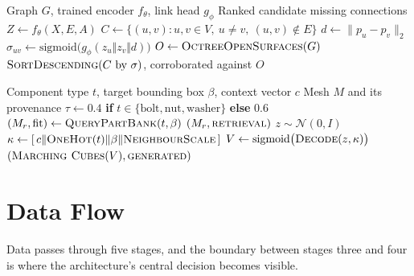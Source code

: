 \documentclass[12pt,oneside,a4paper]{report}
\begin{document}
\begin{algorithm}[h]
\caption{Missing-component detection at inference}
\label{alg:detect}
\begin{algorithmic}[1]
\Require Graph $G$, trained encoder $f_\theta$, link head $g_\phi$
\Ensure Ranked candidate missing connections
\State $Z \gets f_\theta(X, E, A)$ 
\State $C \gets \{(u,v) : u,v \in V,\ u \neq v,\ (u,v) \notin E\}$
  \State $d \gets \lVert p_u - p_v \rVert_2$ 
  \State $\sigma_{uv} \gets \mathrm{sigmoid}\big(g_\phi(z_u \Vert z_v \Vert d)\big)$
\EndFor
\State $O \gets \textsc{OctreeOpenSurfaces}(G)$ 
\State \Return $\textsc{SortDescending}(C \text{ by } \sigma)$, corroborated against $O$
\end{algorithmic}
\end{algorithm}

\begin{algorithm}[h]
\caption{Hybrid shape generation}
\label{alg:shapegen}
\begin{algorithmic}[1]
\Require Component type $t$, target bounding box $\beta$, context vector $c$
\Ensure Mesh $M$ and its provenance
\State $\tau \gets 0.4$ \textbf{if} $t \in \{\text{bolt},\text{nut},\text{washer}\}$ \textbf{else} $0.6$
\State $(M_r, \mathrm{fit}) \gets \textsc{QueryPartBank}(t, \beta)$
  \State \Return $(M_r, \textsc{retrieval})$ 
\EndIf
\State $z \sim \mathcal{N}(0, I)$
\State $\kappa \gets [\,c \Vert \textsc{OneHot}(t) \Vert \beta \Vert \textsc{NeighbourScale}\,]$ 
\State $V \gets \mathrm{sigmoid}\big(\textsc{Decode}(z, \kappa)\big)$ 
\State \Return $(\textsc{Marching Cubes}(V), \textsc{generated})$
\end{algorithmic}
\end{algorithm}

\section{Data Flow}

Data passes through five stages, and the boundary between stages three and four
is where the architecture's central decision becomes visible.
\end{document}
